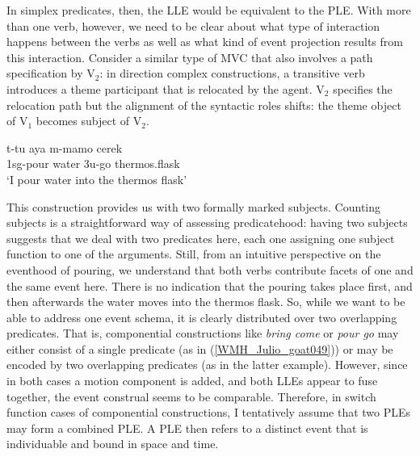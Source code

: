 In simplex predicates, then, the LLE would be equivalent to the PLE. With more than one verb, however, we need to be clear about what type of interaction happens between the verbs as well as what kind of event projection results from this interaction. Consider a similar type of MVC that also involves a path specification by V$_2$: in direction complex constructions, a transitive verb introduces a theme participant that is relocated by the agent. V$_2$ specifies the relocation path but the alignment of the syntactic roles shifts: the theme object of V$_1$ becomes subject of V$_2$.

\ea \label{}
\gll t-tu aya m-mamo cerek \\
1\acs{sg}-pour water 3\acs{u}-go thermos.flask \\
\glft `I pour water into the thermos flask' \ 
\z
\xe

This construction provides us with two formally marked subjects. Counting subjects is a straightforward way of assessing predicatehood: having two subjects suggests that we deal with two predicates here, each one assigning one subject function to one of the arguments. Still, from an intuitive perspective on the eventhood of pouring, we understand that both verbs contribute facets of one and the same event here. There is no indication that the pouring takes place first, and then afterwards the water moves into the thermos flask. So, while we want to be able to address one event schema, it is clearly distributed over two overlapping predicates. That is, componential constructions like \textit{bring come} or \textit{pour go} may either consist of a single predicate (as in (\ref{WMH_Julio_goat049})) or may be encoded by two overlapping predicates (as in the latter example). However, since in both cases a motion component is added, and both LLEs appear to fuse together, the event construal seems to be comparable. Therefore, in switch function cases of componential constructions, I tentatively assume that two PLEs may form a combined PLE. A PLE then refers to a distinct event that is individuable and bound in space and time.

